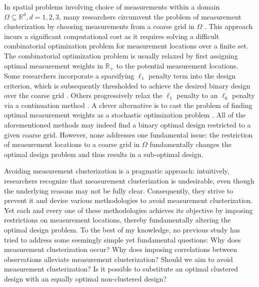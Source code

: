 In spatial problems involving choice of measurements within a domain
$\Omega \subseteq \mathbb{R}^d, d=1,2,3$, many researchers circumvent
the problem of measurement clusterization by choosing measurements
from a coarse grid in $\Omega$ \cite{koval2020, alexanderian2021,
  attia2020, alexanderian2014, alexanderian2016,
  alexanderian2018efficient}. This approach incurs a significant
computational cost as it requires solving a difficult combinatorial
optimization problem for measurement locations over a finite set. The
combinatorial optimization problem is usually relaxed by first
assigning optimal measurement weights in $\mathbb{R}_+$ to the
potential measurement locations. Some researchers incorporate a
sparsifying $\ell_1$ penalty term into the design criterion, which is
subsequently thresholded to achieve the desired binary design over the
coarse grid \cite{horesh2008borehole}. Others progressively relax the
$\ell_1$ penalty to an $\ell_0$ penalty via a continuation method
\cite{alexanderian2016, alexanderian2014}. A clever alternative is to
cast the problem of finding optimal measurement weights as a
stochastic optimization problem \cite{attia2022stochastic}. All of the
aforementioned methods may indeed find a binary optimal design
restricted to a given coarse grid. However, none addresses one
fundamental issue: the restriction of measurement locations to a
coarse grid in $\Omega$ fundamentally changes the optimal design
problem and thus results in a sub-optimal design.

Avoiding measurement clusterization is a pragmatic approach:
intuitively, researchers recognize that measurement clusterization is
undesirable, even though the underlying reasons may not be fully
clear. Consequently, they strive to prevent it and devise various
methodologies to avoid measurement clusterization. Yet each and every
one of these methodologies achieves its objective by imposing
restrictions on measurement locations, thereby fundamentally altering
the optimal design problem. To the best of my knowledge, no previous
study has tried to address some seemingly simple yet fundamental
questions:
%
Why does measurement clusterization occur?
%
Why does imposing correlations between observations alleviate
measurement clusterization?
%
Should we aim to avoid measurement clusterization?
%
Is it possible to substitute an optimal clustered design with an
equally optimal non-clustered design?


